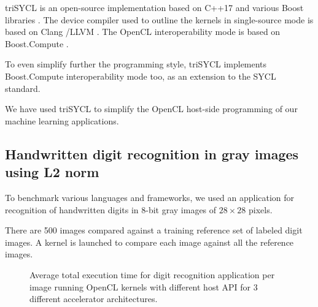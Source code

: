 \documentclass[sigplan]{acmart}
\begin{document}
triSYCL \cite{triSYCL} is an open-source implementation based on C++17
and various Boost libraries \cite{Boost-1.63}. The device compiler used to
outline the kernels in single-source mode is based on Clang
\cite{Clang-4.0}/LLVM \cite{LLVM-4.0}. The OpenCL interoperability mode is
based on Boost.Compute \cite{Boost.Compute}.

To even simplify further the programming style, triSYCL
implements Boost.Compute interoperability mode too, as an extension to
the SYCL standard.

We have used triSYCL to simplify the OpenCL host-side programming of
our machine learning applications.


\subsection{Handwritten digit recognition in gray images using L2
  norm}
\label{sec:example-from-anast}

To benchmark various languages and frameworks, we used an application
for recognition of handwritten digits in 8-bit gray images of
$28 \times 28$ pixels.

There are 500 images compared against a training reference
set of labeled digit images. A kernel is launched to compare each
image against all the reference images.

\begin{figure}
  \caption{Average total execution time for digit recognition
    application per image running OpenCL kernels with different host
    API for 3 different accelerator architectures.}
  \label{fig:results-digit-recognition}
\end{figure}
\end{document}
